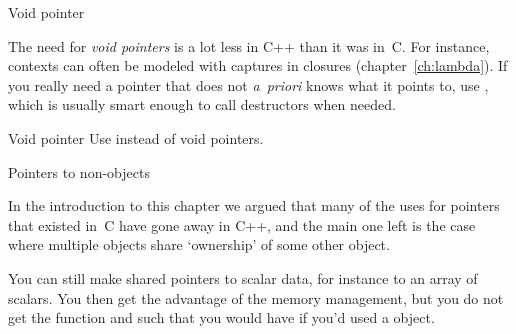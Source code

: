  {Void pointer}

The need for \emph{void pointers}
is a lot less in C++ than it was in~C. For
instance, contexts can often be modeled with captures in closures
(chapter~\ref{ch:lambda}). If you really need a pointer that does not
\textit{a~priori} knows what it points to, use ,
which is usually smart enough to call destructors when needed.

\begin{slide}{Void pointer}
  \label{sl:void-ptr}
  Use  instead of void pointers.
\end{slide}

 {Pointers to non-objects}

In the introduction to this chapter we argued that many of the uses
for pointers that existed in~C have gone away in C++, and the main one
left is the case where multiple objects share `ownership' of some
other object.

You can still make shared pointers to scalar data, for instance to an
array of scalars. You then get the advantage of the memory management,
but you do not get the  function and such that you would have
if you'd used a  object.
%

